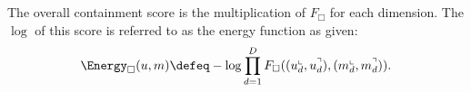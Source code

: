 The overall containment score is the multiplication of $F_{\Box}$ for each dimension. The $\operatorname{log}$ of this score is referred to as the energy function as given:
\begin{equation}
\label{eq:energy}
\Energy_\Box(u,m) \defeq -\log \prod_{d=1}^D F_\Box((u_{d}^\llcorner, u_{d}^\urcorner), (m_d^\llcorner, m_d^\urcorner)).
\end{equation}




